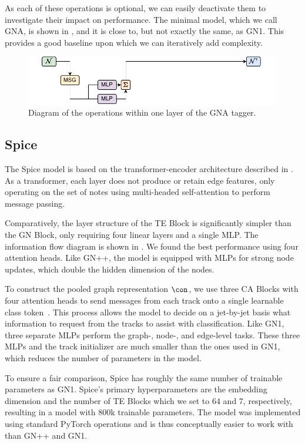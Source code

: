 As each of these operations is optional, we can easily deactivate them to investigate their impact on performance.
The minimal model, which we call GNA, is shown in , and it is close to, but not exactly the same, as GN1.
This provides a good baseline upon which we can iteratively add complexity.

\begin{figure}[h!]
    \centering
    \includegraphics[width=0.99\textwidth]{figures/flavour_tagging/gna.pdf}
    \caption{Diagram of the operations within one layer of the GNA tagger.}
    \label{fig:gna_graph}
\end{figure}

\subsection{Spice}

The Spice model is based on the transformer-encoder architecture described in .
As a transformer, each layer does not produce or retain edge features, only operating on the set of notes using multi-headed self-attention to perform message passing.

Comparatively, the layer structure of the TE Block is significantly simpler than the GN Block, only requiring four linear layers and a single MLP\@.
The information flow diagram is shown in .
We found the best performance using four attention heads.
Like GN++, the model is equipped with MLPs for strong node updates, which double the hidden dimension of the nodes.

To construct the pooled graph representation $\con$, we use three CA Blocks with four attention heads to send messages from each track onto a single learnable class token~\cite{GoingDeeper}.
This process allows the model to decide on a jet-by-jet basis what information to request from the tracks to assist with classification.
Like GN1, three separate MLPs perform the graph-, node-, and edge-level tasks.
These three MLPs and the track initializer are much smaller than the ones used in GN1, which reduces the number of parameters in the model.

To ensure a fair comparison, Spice has roughly the same number of trainable parameters as GN1.
Spice's primary hyperparameters are the embedding dimension and the number of TE Blocks which we set to 64 and 7, respectively, resulting in a model with 800k trainable parameters.
The model was implemented using standard PyTorch operations and is thus conceptually easier to work with than GN++ and GN1.

